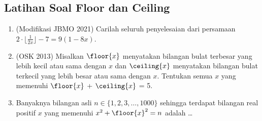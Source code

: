 \subsection{Latihan Soal Floor dan Ceiling}
\begin{enumerate}
    \item (Modifikasi JBMO 2021) Carilah seluruh penyelesaian dari persamaan $2\cdot \lfloor{\frac{1}{2x}}\rfloor - 7 = 9(1 - 8x)$.

    \item (OSK 2013) Misalkan $\floor{x}$ menyatakan bilangan bulat terbesar yang lebih kecil atau sama dengan $x$ dan $\ceiling{x}$ menyatakan bilangan bulat terkecil yang lebih besar atau sama dengan $x$. Tentukan semua $x$ yang memenuhi $\floor{x}$ + $\ceiling{x}$ = 5.
    
    \item Banyaknya bilangan asli $n \in \{1,2,3,\dots,1000\}$ sehingga terdapat bilangan real positif $x$ yang memenuhi $x^2+\floor{x}^2=n$ adalah \dots
\end{enumerate}